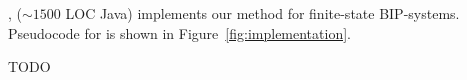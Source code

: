 \ldfctool, ($\sim 1500$ LOC Java) implements our method for finite-state BIP-systems.
Pseudocode for \ldfctool is shown in Figure~\ref{fig:implementation}.


TODO
